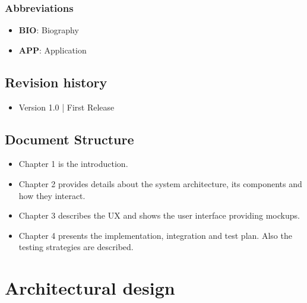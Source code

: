 \documentclass{article}
\begin{document}
\subsubsection{Abbreviations}
\begin{itemize}
    \item \textbf{BIO}: Biography
    \item \textbf{APP}: Application
\end{itemize}

\subsection{Revision history}
\begin{itemize}
	\item Version 1.0 | First Release
\end{itemize}


\subsection{Document Structure}
\begin{itemize}
	\item Chapter 1 is the introduction.
	\item Chapter 2 provides details about the system architecture, its components and how they interact.
	\item Chapter 3 describes the UX and shows the user interface providing mockups.
	\item Chapter 4 presents the implementation, integration and test plan. Also the testing strategies are described.
\end{itemize}

\newpage

\section{Architectural design}
\end{document}
